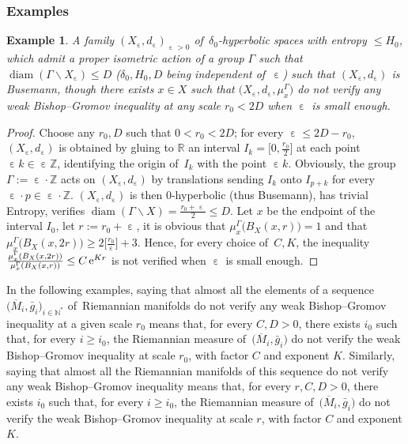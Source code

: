 \documentclass[10pt,a4paper]{amsart}
\numberwithin{equation}{section}
\newtheorem{exa}[theor]{Example}
\newcommand{\N}{\mathbb{N}}
\newcommand{\Z}{\mathbb{Z}}
\newcommand{\R}{\mathbb{R}}
\newcommand{\diam}{\operatorname{diam}}
\newcommand{\e}{\operatorname{\varepsilon}}
\begin{document}
\subsubsection{Examples}

\begin{exa}\label{exemplebis} A family $(X_{\e}, d_{\e})_{\e > 0}$ of~$\delta_0$-hyperbolic spaces with entropy $ \le H_0$, which admit a proper isometric action of a group $\Gamma$ such that $\diam (\Gamma \backslash X_{\e}) \le D$ ($\delta_0, H_0, D$ being independent of~$\e$) such that
$(X_{\e}, d_{\e})$ is Busemann, though there exists $x \in X$ such that $\big(X_{\e}, d_{\e}, \mu^\Gamma_x\big)$ do not verify any weak Bishop--Gromov inequality at any scale $r_0 < 2 D$ when $\e$ is small enough.
\end{exa}

\begin{proof}Choose any $r_0, D$ such that $0 < r_0 < 2 D$; for every $ \e \le 2 D - r_0$, $(X_{\e}, d_{\e})$ is obtained by gluing to $\R$ an interval $I_k = \big[0, \frac{r_0}{2} \big]$ at each point $\e k \in
\e \mathbb Z$,
identifying the origin of~$I_k$ with the point $\e k$. Obviously, the group $\Gamma := \e \cdot \Z$ acts on $(X_{\e}, d_{\e})$ by translations sending $I_k$
onto $I_{p+k}$ for every $ \e\cdot p \in \e \cdot \Z$.
$(X_{\e}, d_{\e})$ is then $0$-hyperbolic (thus Busemann), has trivial Entropy, verifies $\diam (\Gamma \backslash X) = \frac{r_0 + \e}{2} \le D $. Let $x$ be the
endpoint of the interval $I_0$, let $r := r_0 + \e$, it is obvious that
$\mu_{x}^{\Gamma}\big(B_X (x, r) \big) = 1$ and that
$\mu_{x}^{\Gamma}\big(B_X (x, 2 r) \big) \ge 2 \big[ \frac{r_0}{\e}\big] + 3 $. Hence, for every choice of~$C, K$, the inequality
$\frac{\mu_{x}^{\Gamma}(B_X (x, 2 r))}{\mu_{x}^{\Gamma}(B_X(x, r))} \le C\, {\rm e}^{Kr}$ is not verified when $\e$ is small enough.
\end{proof}


In the following examples, saying that almost all the elements of a sequence $\big(\overline M_i, \bar g_i\big)_{i \in \N^*}$ of~Riemannian manifolds
do not verify any weak
Bishop--Gromov inequality at a given scale $r_0$ means that, for every $C, D > 0$, there exists $i_0 $ such that, for every $i \ge i_0$, the Riemannian
measure of~$\big(\overline M_i, \bar g_i\big)$ do not verify the weak Bishop--Gromov inequality at scale $ r_0$, with factor $C$ and exponent $K$.
Similarly, saying that almost all the Riemannian manifolds of this sequence do not verify any weak Bishop--Gromov inequality means that,
for every $r, C, D > 0$, there exists $i_0 $ such that, for every $i \ge i_0$, the Riemannian measure of~$\big(\overline M_i, \bar g_i\big)$
do not verify the weak Bishop--Gromov inequality at scale $ r$, with factor $C$ and exponent $K$.
\end{document}

